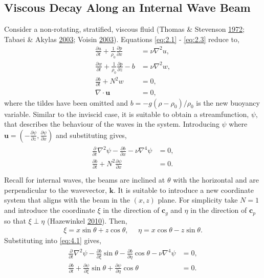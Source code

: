 \documentclass[a4paper]{article}
\numberwithin{equation}{section}
\begin{document}
\subsection{Viscous Decay Along an Internal Wave Beam}
\label{sec:4.1}
Consider a non-rotating, stratified, viscous fluid (Thomas \& Stevenson \hyperlink{ref 21}{1972}; Tabaei \& Akylas \hyperlink{ref 22}{2003}; Voisin \hyperlink{ref 23}{2003}). Equations \eqref{eq:2.1} - \eqref{eq:2.3} reduce to,
\begin{align*}
\frac{\partial u}{\partial t} + \frac{1}{\rho_0}\frac{\partial p}{\partial x} &= \nu \nabla^2u, \\
\frac{\partial w}{\partial t} + \frac{1}{\rho_0}\frac{\partial p}{\partial z} - b &= \nu \nabla^2w, \\
\frac{\partial b}{\partial t} + N^2w &= 0, \\
\nabla \cdot \mathbf{u} &= 0,
\end{align*}
where the tildes have been omitted and $b = -g(\rho - \rho_0)/\rho_0$ is the new buoyancy variable. Similar to the inviscid case, it is suitable to obtain a streamfunction, $\psi$, that describes the behaviour of the waves in the system. Introducing $\psi$ where $\mathbf{u} = (-\frac{\partial \psi}{\partial z},\frac{\partial \psi}{\partial x})$ and substituting gives,
\begin{align}\label{eq:4.1}
\begin{split}
\frac{\partial}{\partial t} \nabla ^2 \psi - \frac{\partial b}{\partial x} - \nu \nabla^4 \psi &= 0, \\
\frac{\partial b}{\partial t} + N^2\frac{\partial \psi}{\partial x} &= 0. \\
\end{split}
\end{align}
Recall for internal waves, the beams are inclined at $\theta$ with the horizontal and are perpendicular to the wavevector, $\mathbf{k}$. It is suitable to introduce a new coordinate system that aligns with the beam in the $(x,z)$ plane. For simplicity take $N = 1$ and introduce the coordinate $\xi$ in the direction of $\mathbf{c}_g$ and $\eta$ in the direction of $\mathbf{c}_p$ so that $\xi \perp \eta$ (Hazewinkel \hyperlink{ref 24}{2010}). Then,
\begin{align*}
\xi = x\sin\theta + z\cos\theta, ~~~~~~
\eta = x\cos\theta - z\sin\theta.
\end{align*}
Substituting into \eqref{eq:4.1} gives, 
\begin{align*}
\begin{split}
\frac{\partial}{\partial t} \nabla ^2 \psi - \frac{\partial b}{\partial \xi}\sin\theta- \frac{\partial b}{\partial \eta}\cos\theta  - \nu \nabla^4 \psi &= 0, \\
\frac{\partial b}{\partial t} + \frac{\partial \psi}{\partial \xi}\sin\theta + \frac{\partial \psi}{\partial \eta}\cos\theta &= 0. \\
\end{split}
\end{align*}
\end{document}
